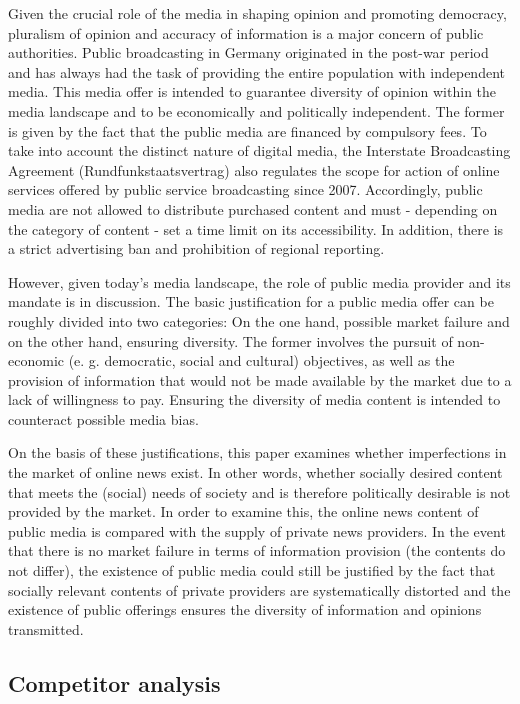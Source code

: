 \documentclass[12pt,a4paper,notitlepage]{article}
\begin{document}
Given the crucial role of the media in shaping opinion and promoting democracy, pluralism of opinion and accuracy of information is a major concern of public authorities. Public broadcasting in Germany originated in the post-war period and has always had the task of providing the entire population with independent media. This media offer is intended to guarantee diversity of opinion within the media landscape and to be economically and politically independent. The former is given by the fact that the public media are financed by compulsory fees. To take into account the distinct nature of digital media, the Interstate Broadcasting Agreement (Rundfunkstaatsvertrag) also regulates the scope for action of online services offered by public service broadcasting since 2007. Accordingly, public media are not allowed to distribute purchased content and must - depending on the category of content - set a time limit on its accessibility. In addition, there is a strict advertising ban and prohibition of regional reporting. 

However, given today's media landscape, the role of public media provider and its mandate is in discussion. The basic justification for a public media offer can be roughly divided into two categories: On the one hand, possible market failure and on the other hand, ensuring diversity. The former involves the pursuit of non-economic (e. g. democratic, social and cultural) objectives, as well as the provision of information that would not be made available by the market due to a lack of willingness to pay. Ensuring the diversity of media content is intended to counteract possible media bias. 

On the basis of these justifications, this paper examines whether imperfections in the market of online news exist. In other words, whether socially desired content that meets the (social) needs of society and is therefore politically desirable is not provided by the market. In order to examine this, the online news content of public media is compared with the supply of private news providers. In the event that there is no market failure in terms of information provision (the contents do not differ), the existence of public media could still be justified by the fact that socially relevant contents of private providers are systematically distorted and the existence of public offerings ensures the diversity of information and opinions transmitted. 

\subsection{Competitor analysis}
\end{document}
